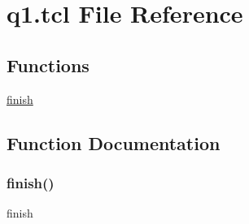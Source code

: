 \hypertarget{q1_8tcl}{}\section{q1.\+tcl File Reference}
\label{q1_8tcl}
\subsection*{Functions}
\begin{DoxyCompactItemize}
\item 
\hyperlink{q1_8tcl_a30728837c246b65ef76298af0101d99c}{finish}
\end{DoxyCompactItemize}


\subsection{Function Documentation}
\mbox{\label{q1_8tcl_a30728837c246b65ef76298af0101d99c}} 
\subsubsection{\texorpdfstring{finish()}{finish()}}
{\footnotesize\ttfamily finish}


